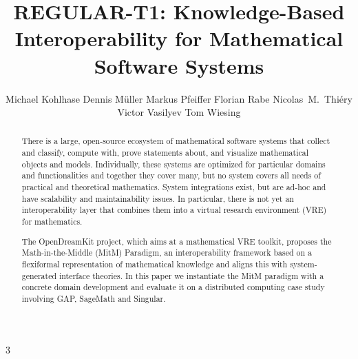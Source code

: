 3\documentclass{llncs}
\title{REGULAR-T1: Knowledge-Based Interoperability for Mathematical Software Systems}
\author{
Michael Kohlhase\inst{1} 
Dennis M\"uller\inst{1} 
Markus Pfeiffer\inst{3} 
Florian Rabe\inst{2} 
Nicolas~M.~Thiéry\inst{4} 
Victor Vasilyev\inst{3} 
Tom Wiesing\inst{1}
}
\institute{
   FAU Erlangen-N\"urnberg
   \and Jacobs University Bremen
   \and University of St~Andrews 
   \and Universit\'e Paris-Sud
}
\begin{document}
\maketitle
\begin{abstract}
  There is a large, open-source ecosystem of mathematical software systems that collect and
  classify, compute with, prove statements about, and visualize mathematical objects and
  models. Individually, these systems are optimized for particular domains and
  functionalities and together they cover many, but no system covers all needs of
  practical and theoretical mathematics. System integrations exist, but are ad-hoc and
  have scalability and maintainability issues. In particular, there is not yet an
  interoperability layer that combines them into a virtual research environment (VRE) for
  mathematics.
  
  The OpenDreamKit project, which aims at a mathematical VRE toolkit, proposes the
  Math-in-the-Middle (MitM) Paradigm, an interoperability framework based on a flexiformal
  representation of mathematical knowledge and aligns this with system-generated interface
  theories. In this paper we instantiate the MitM paradigm with a concrete domain
  development and evaluate it on a distributed computing case study involving GAP,
  SageMath and Singular. 
\end{abstract}






  
  
\printbibliography
\end{document}
